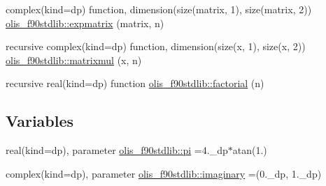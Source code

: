 \begin{DoxyCompactItemize}
complex(kind=dp) function, dimension(size(matrix, 1), size(matrix, 2)) \hyperlink{namespaceolis__f90stdlib_a309c2107f5d5071bb8c1bad4362f88e1}{olis\+\_\+f90stdlib\+::expmatrix} (matrix, n)
\item 
recursive complex(kind=dp) function, dimension(size(x, 1), size(x, 2)) \hyperlink{namespaceolis__f90stdlib_af70533a90b595522cd1bf47b37a2319d}{olis\+\_\+f90stdlib\+::matrixmul} (x, n)
\item 
recursive real(kind=dp) function \hyperlink{namespaceolis__f90stdlib_ad0e4f304a609e1d8c088778344f1aa67}{olis\+\_\+f90stdlib\+::factorial} (n)
\end{DoxyCompactItemize}
\subsection*{Variables}
\begin{DoxyCompactItemize}
\item 
real(kind=dp), parameter \hyperlink{namespaceolis__f90stdlib_a106e09303fbf05972f0635ff67f73c9d}{olis\+\_\+f90stdlib\+::pi} =4.\+\_\+dp$\ast$atan(1.)
\item 
complex(kind=dp), parameter \hyperlink{namespaceolis__f90stdlib_a0a22d30625256a14acc49cd749e88cb7}{olis\+\_\+f90stdlib\+::imaginary} =(0.\+\_\+dp, 1.\+\_\+dp)
\end{DoxyCompactItemize}
